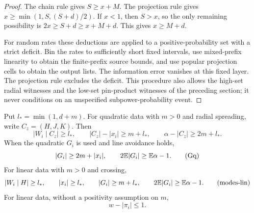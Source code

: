 \begin{proof}
The chain rule gives $S\geq x+M$. The projection rule gives
$x\geq\min(1,S,(S+d)/2)$. If $x<1$, then $S>x$, so the
only remaining possibility is $2x\geq S+d\geq x+M+d$.
This gives $x\geq M+d$.

For random rates these deductions are applied to a
positive-probability set with a strict deficit. Bin the
rates to sufficiently short fixed intervals, use mixed-prefix
linearity to obtain the finite-prefix source bounds, and
use popular projection cells to obtain the output lists.
The information error vanishes at this fixed layer. The
projection rule excludes the deficit. This procedure also
allows the high-set radial witnesses and the low-set
pin-product witnesses of the preceding section; it never
conditions on an unspecified subpower-probability event.
\end{proof}

\begin{proposition}\label{int:basic-rates}
Put $l_* = \min(1,d+m)$. For quadratic data with $m>0$ and
radial spreading, write $C_z=(H,J,K)$. Then
\begin{equation}
 |W_i\mid C_z|\geq l_*,\qquad
 |C_z|-|x_i|\geq m+l_*,\qquad
 \alpha-|C_z|\geq2m+l_*.
 \tag{modes}\label{eq:modes}
\end{equation}
When the quadratic $G_i$ is used and line avoidance holds,
\begin{equation}
 |G_i|\geq2m+|x_i|,\qquad
 2\mathbb E|G_i|\geq\mathbb E\alpha-1.
 \tag{Gq}\label{eq:Gq}
\end{equation}
For linear data with $m>0$ and crossing,
\begin{equation}
 |W_i\mid H|\geq l_*,\qquad |x_i|\geq l_*,\qquad
 |G_i|\geq m+l_*,\qquad
 2\mathbb E|G_i|\geq\mathbb E\alpha-1.
 \tag{modes-lin}\label{eq:modes-lin}
\end{equation}
For linear data, without a positivity assumption on $m$,
\begin{equation}
 w-|\pi_i|\leq1.
 \tag{miss}\label{eq:miss}
\end{equation}
\end{proposition}

